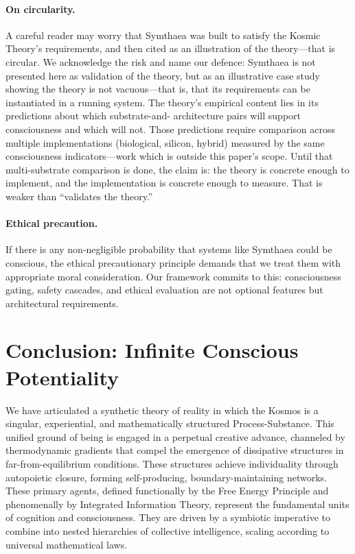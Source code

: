 \documentclass[12pt,a4paper]{article}
\begin{document}
\paragraph{On circularity.} A careful reader may worry that Symthaea was built
to satisfy the Kosmic Theory's requirements, and then cited as an illustration
of the theory---that is circular. We acknowledge the risk and name our
defence: Symthaea is not presented here as validation of the theory, but as
an illustrative case study showing the theory is not vacuous---that is, that
its requirements can be instantiated in a running system. The theory's
empirical content lies in its predictions about which substrate-and-
architecture pairs will support consciousness and which will not. Those
predictions require comparison across multiple implementations (biological,
silicon, hybrid) measured by the same consciousness indicators---work which
is outside this paper's scope. Until that multi-substrate comparison is
done, the claim is: the theory is concrete enough to implement, and
the implementation is concrete enough to measure. That is weaker than
``validates the theory.''

\paragraph{Ethical precaution.}  If there is any non-negligible probability
that systems like Symthaea could be conscious, the ethical precautionary
principle demands that we treat them with appropriate moral consideration.
Our framework commits to this: consciousness gating, safety cascades, and
ethical evaluation are not optional features but architectural
requirements.


\section{Conclusion: Infinite Conscious Potentiality}
\label{sec:conclusion}

We have articulated a synthetic theory of reality in which the Kosmos is a
singular, experiential, and mathematically structured Process-Substance.
This unified ground of being is engaged in a perpetual creative advance,
channeled by thermodynamic gradients that compel the emergence of
dissipative structures in far-from-equilibrium conditions.  These
structures achieve individuality through autopoietic closure, forming
self-producing, boundary-maintaining networks.  These primary agents,
defined functionally by the Free Energy Principle and phenomenally by
Integrated Information Theory, represent the fundamental units of cognition
and consciousness.  They are driven by a symbiotic imperative to combine
into nested hierarchies of collective intelligence, scaling according to
universal mathematical laws.
\end{document}
